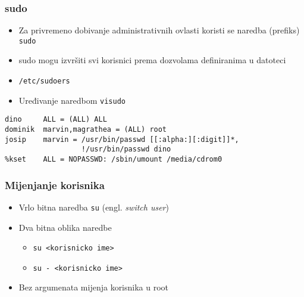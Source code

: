 \documentclass[table,usenames,dvipsnames] {beamer}
\newcommand{\shell}[1]{\texttt{#1}}
\begin{document}
\begin{frame}[fragile]
\frametitle{sudo}
\begin{itemize}
  \item Za privremeno dobivanje administrativnih ovlasti koristi se naredba (prefiks) \shell{sudo}
  \item sudo mogu izvršiti svi korisnici prema dozvolama definiranima u datoteci
  \item[] {\small\shell{/etc/sudoers}}
  \item Uređivanje naredbom \shell{visudo}
\end{itemize}
\vfill
\footnotesize
\begin{Verbatim}
dino     ALL = (ALL) ALL
dominik  marvin,magrathea = (ALL) root
josip    marvin = /usr/bin/passwd [[:alpha:][:digit]]*,
                  !/usr/bin/passwd dino
%kset    ALL = NOPASSWD: /sbin/umount /media/cdrom0
\end{Verbatim}
\end{frame}

\begin{frame}[t]
\frametitle{Mijenjanje korisnika} 
\begin{itemize}
  \item Vrlo bitna naredba \shell{su} (engl. \emph{switch user})
  \item Dva bitna oblika naredbe
  \begin{itemize}
    \item \shell{su <korisnicko ime>}
    \item \shell{su - <korisnicko ime>}
  \end{itemize}
  \item Bez argumenata mijenja korisnika u root
\end{itemize}
\end{frame}
\end{document}
